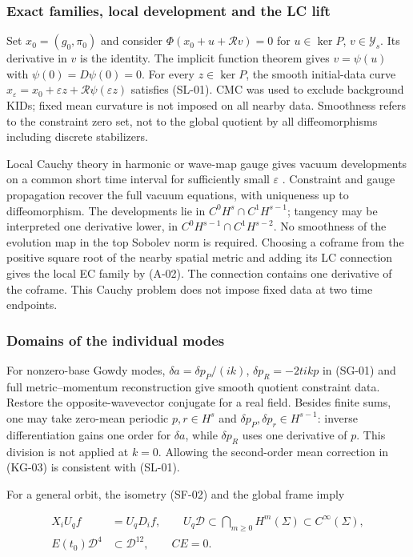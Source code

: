\subsubsection{Exact families, local development and the LC lift}
Set $x_0=(g_0,\pi_0)$ and consider $\Phi(x_0+u+\mathscr Rv)=0$ for $u\in\ker P$, $v\in\mathcal Y_s$. Its derivative in $v$ is the identity. The implicit function theorem gives $v=\psi(u)$ with $\psi(0)=D\psi(0)=0$. For every $z\in\ker P$, the smooth initial-data curve $x_\varepsilon=x_0+\varepsilon z+\mathscr R\psi(\varepsilon z)$ satisfies (SL-01). CMC was used to exclude background KIDs; fixed mean curvature is not imposed on all nearby data. Smoothness refers to the constraint zero set, not to the global quotient by all diffeomorphisms including discrete stabilizers.

Local Cauchy theory in harmonic or wave-map gauge gives vacuum developments on a common short time interval for sufficiently small $\varepsilon$ \cite{HughesKatoMarsden1977}. Constraint and gauge propagation recover the full vacuum equations, with uniqueness up to diffeomorphism. The developments lie in $C^0H^s\cap C^1H^{s-1}$; tangency may be interpreted one derivative lower, in $C^0H^{s-1}\cap C^1H^{s-2}$. No smoothness of the evolution map in the top Sobolev norm is required. Choosing a coframe from the positive square root of the nearby spatial metric and adding its LC connection gives the local EC family by (A-02). The connection contains one derivative of the coframe. This Cauchy problem does not impose fixed data at two time endpoints.

\subsubsection{Domains of the individual modes}
For nonzero-base Gowdy modes, $\delta a=\delta p_P/(ik)$, $\delta p_R=-2tikp$ in (SG-01) and full metric--momentum reconstruction give smooth quotient constraint data. Restore the opposite-wavevector conjugate for a real field. Besides finite sums, one may take zero-mean periodic $p,r\in H^s$ and $\delta p_P,\delta p_r\in H^{s-1}$: inverse differentiation gains one order for $\delta a$, while $\delta p_R$ uses one derivative of $p$. This division is not applied at $k=0$. Allowing the second-order mean correction in (KG-03) is consistent with (SL-01).

For a general orbit, the isometry (SF-02) and the global frame imply

\begin{equation}\tag{SL-06}\label{eq:SL-06}
\begin{aligned}
X_iU_qf&=U_qD_if,\qquad
U_q\mathcal D\subset\bigcap_{m\ge0}H^m(\Sigma)\subset C^\infty(\Sigma),\\
E(t_0)\mathcal D^4&\subset\mathcal D^{12},\qquad CE=0.
\end{aligned}
\end{equation}

